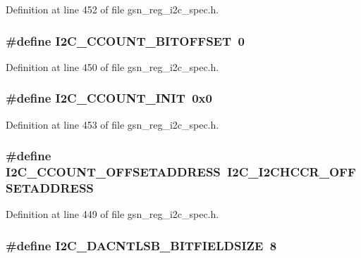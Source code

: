 Definition at line 452 of file gsn\_\-reg\_\-i2c\_\-spec.h.

\hypertarget{a00558_a24dc1fbcfd5227e6bf53e9902149a065}{
\subsubsection[{I2C\_\-CCOUNT\_\-BITOFFSET}]{\setlength{\rightskip}{0pt plus 5cm}\#define I2C\_\-CCOUNT\_\-BITOFFSET~0}}
\label{a00558_a24dc1fbcfd5227e6bf53e9902149a065}


Definition at line 450 of file gsn\_\-reg\_\-i2c\_\-spec.h.

\hypertarget{a00558_a60573ffe8dacd89636a89dc2c17181d9}{
\subsubsection[{I2C\_\-CCOUNT\_\-INIT}]{\setlength{\rightskip}{0pt plus 5cm}\#define I2C\_\-CCOUNT\_\-INIT~0x0}}
\label{a00558_a60573ffe8dacd89636a89dc2c17181d9}


Definition at line 453 of file gsn\_\-reg\_\-i2c\_\-spec.h.

\hypertarget{a00558_adc7b5d6827dd7a61f8a384af4e0efa2b}{
\subsubsection[{I2C\_\-CCOUNT\_\-OFFSETADDRESS}]{\setlength{\rightskip}{0pt plus 5cm}\#define I2C\_\-CCOUNT\_\-OFFSETADDRESS~I2C\_\-I2CHCCR\_\-OFFSETADDRESS}}
\label{a00558_adc7b5d6827dd7a61f8a384af4e0efa2b}


Definition at line 449 of file gsn\_\-reg\_\-i2c\_\-spec.h.

\hypertarget{a00558_a5ca80e350f9d22248a4aad421b39c1d4}{
\subsubsection[{I2C\_\-DACNTLSB\_\-BITFIELDSIZE}]{\setlength{\rightskip}{0pt plus 5cm}\#define I2C\_\-DACNTLSB\_\-BITFIELDSIZE~8}}
\label{a00558_a5ca80e350f9d22248a4aad421b39c1d4}


